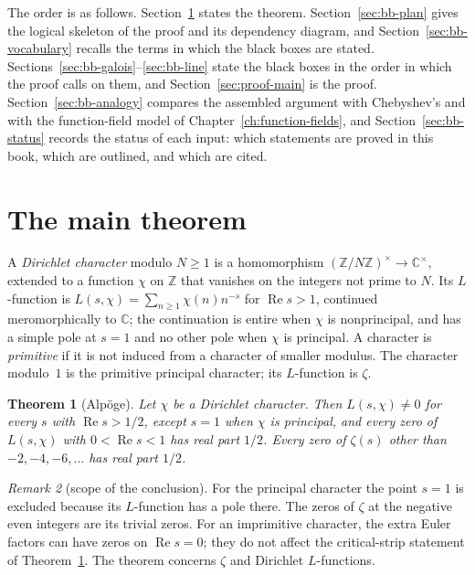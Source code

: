 \documentclass[11pt]{amsbook}
\theoremstyle{plain}
\newtheorem{theorem}{Theorem}[section]
\theoremstyle{definition}
\theoremstyle{remark}
\newtheorem{remark}[theorem]{Remark}
\numberwithin{equation}{section}
\numberwithin{figure}{chapter}
\numberwithin{table}{chapter}
\newcommand{\Z}{\mathbb{Z}}
\renewcommand{\C}{\mathbb{C}}
\begin{document}
The order is as follows. Section~\ref{sec:intro} states the theorem.
Section~\ref{sec:bb-plan} gives the logical skeleton of the proof and
its dependency diagram, and Section~\ref{sec:bb-vocabulary} recalls the
terms in which the black boxes are stated.
Sections~\ref{sec:bb-galois}--\ref{sec:bb-line} state the black boxes
in the order in which the proof calls on them, and
Section~\ref{sec:proof-main} is the proof.
Section~\ref{sec:bb-analogy} compares the assembled argument with
Chebyshev's and with the function-field model of
Chapter~\ref{ch:function-fields}, and Section~\ref{sec:bb-status}
records the status of each input: which statements are proved in this
book, which are outlined, and which are cited.

\section{The main theorem}
\label{sec:intro}

A \emph{Dirichlet character} modulo $N\ge1$ is a homomorphism
$(\Z/N\Z)^\times\to\C^\times$, extended to a function $\chi$ on $\Z$
that vanishes on the integers not prime to $N$. Its $L$-function is
$L(s,\chi)=\sum_{n\ge1}\chi(n)n^{-s}$ for $\operatorname{Re}s>1$,
continued meromorphically to $\C$; the continuation is entire when
$\chi$ is nonprincipal, and has a simple pole at $s=1$ and no other
pole when $\chi$ is principal. A character is \emph{primitive} if it
is not induced from a character of smaller modulus. The character
modulo~$1$ is the primitive principal character; its $L$-function is
$\zeta$.

\begin{theorem}[Alp\"oge]\label{thm:main}
Let $\chi$ be a Dirichlet character. Then $L(s,\chi)\ne0$ for
every $s$ with $\operatorname{Re}s>1/2$, except $s=1$ when $\chi$ is
principal, and every zero of $L(s,\chi)$ with
$0<\operatorname{Re}s<1$ has real part $1/2$. Every zero of
$\zeta(s)$ other than $-2,-4,-6,\dots$ has real part $1/2$.
\end{theorem}

\begin{remark}[scope of the conclusion]\label{rem:scope}
For the principal character the point $s=1$ is excluded because
its $L$-function has a pole there. The zeros of $\zeta$ at the
negative even integers are its trivial zeros. For an imprimitive
character, the extra Euler factors can have zeros on
$\operatorname{Re}s=0$; they do not affect the critical-strip
statement of Theorem~\ref{thm:main}. The theorem concerns
$\zeta$ and Dirichlet $L$-functions.
\end{remark}
\end{document}
